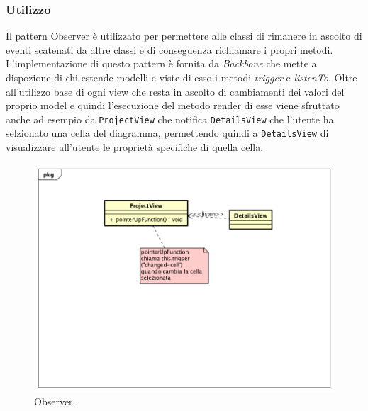 \subsubsection{Utilizzo}
Il pattern Observer è utilizzato per permettere alle classi di rimanere in ascolto di eventi scatenati da altre classi e di conseguenza richiamare i propri metodi.
L'implementazione di questo pattern è fornita da \emph{Backbone} che mette a dispozione di chi estende modelli e viste di esso i metodi \emph{trigger} e \emph{listenTo}. Oltre all'utilizzo base di ogni view che resta in ascolto di cambiamenti dei valori del proprio model e quindi l'esecuzione del metodo render di esse viene sfruttato anche ad esempio da \texttt{ProjectView} che notifica \texttt{DetailsView} che l'utente ha selzionato una cella del diagramma, permettendo quindi a \texttt{DetailsView} di visualizzare all'utente le proprietà specifiche di quella cella.
\begin{figure}[H] \label{fig:observer}
	\includegraphics[scale=0.6]{img/observerExample.png}
	\caption{Observer.}
\end{figure}